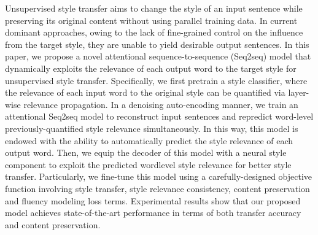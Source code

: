 Unsupervised style transfer aims to change the style of an input sentence while preserving its original content without using parallel training data. In current dominant approaches, owing to the lack of fine-grained control on the influence from the target style, they are unable to yield desirable output sentences. In this paper, we propose a novel attentional sequence-to-sequence (Seq2seq) model that dynamically exploits the relevance of each output word to the target style for unsupervised style transfer. Specifically, we first pretrain a style classifier, where the relevance of each input word to the original style can be quantified via layer-wise relevance propagation. In a denoising auto-encoding manner, we train an attentional Seq2seq model to reconstruct input sentences and repredict word-level previously-quantified style relevance simultaneously. In this way, this model is endowed with the ability to automatically predict the style relevance of each output word. Then, we equip the decoder of this model with a neural style component to exploit the predicted wordlevel style relevance for better style transfer. Particularly, we fine-tune this model using a carefully-designed objective function involving style transfer, style relevance consistency, content preservation and fluency modeling loss terms. Experimental results show that our proposed model achieves state-of-the-art performance in terms of both transfer accuracy and content preservation.
